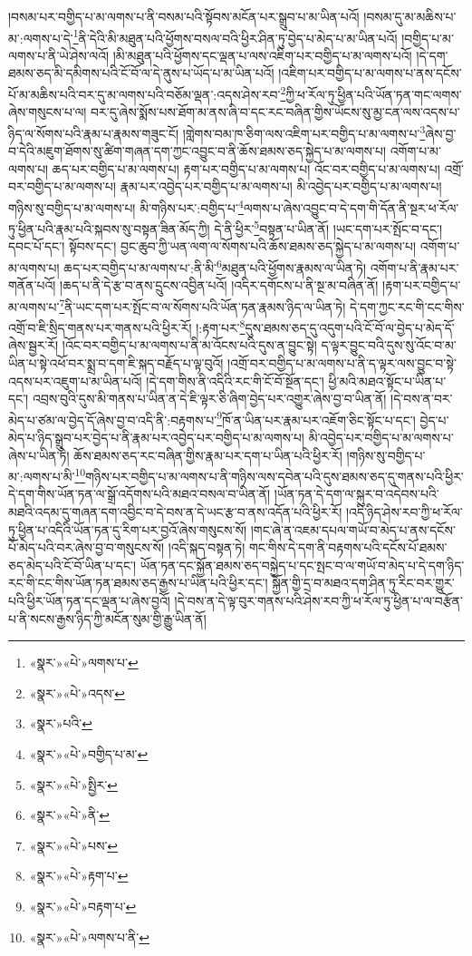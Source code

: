 །བསམ་པར་བགྱིད་པ་མ་ལགས་པ་ནི་བསམ་པའི་སྟོབས་མངོན་པར་སྒྲུབ་པ་མ་ཡིན་པའོ། །བསམ་དུ་མ་མཆིས་པ་མ་:ལགས་པ་དེ་\footnote{«སྣར་»«པེ་»ལགས་པ་}ནི་དེའི་མི་མཐུན་པའི་ཕྱོགས་བསལ་བའི་ཕྱིར་ཤིན་ཏུ་བྱེད་པ་མེད་པ་མ་ཡིན་པའོ། །བགྱིད་པ་མ་ལགས་པ་ནི་ཡེ་ཤེས་ལའོ། །མི་མཐུན་པའི་ཕྱོགས་དང་ལྡན་པ་ལས་འཇིག་པར་བགྱིད་པ་མ་ལགས་པའོ། །དེ་དག་ཐམས་ཅད་མི་དམིགས་པའི་ངོ་བོ་ལ་དེ་ནུས་པ་ཡོད་པ་མ་ཡིན་པའོ། །འཇིག་པར་བགྱིད་པ་མ་ལགས་པ་ནས་དངོས་པོ་མ་མཆིས་པའི་བར་དུ་མ་ལགས་པའི་བཅོམ་ལྡན་:འདས་ཤེས་རབ་\footnote{«སྣར་»«པེ་»འདས་}ཀྱི་ཕ་རོལ་ཏུ་ཕྱིན་པའི་ཡོན་ཏན་གང་ལགས་ཞེས་གསུངས་པ་ལ། བར་དུ་ཞེས་སྨོས་པས་ཐོག་མ་ནས་ཞི་བ་དང་རང་བཞིན་གྱིས་ཡོངས་སུ་མྱ་ངན་ལས་འདས་པ་ཉིད་ལ་སོགས་པའི་རྣམ་པ་རྣམས་གཟུང་ངོ། །གླེགས་བམ་ཁ་ཅིག་ལས་འཇིག་པར་བགྱིད་པ་མ་ལགས་པ་\footnote{«སྣར་»པའི་}ཞེས་བྱ་བ་དེའི་མཇུག་ཐོགས་སུ་ཚིག་གཞན་དག་ཀྱང་འབྱུང་བ་ནི་ཆོས་ཐམས་ཅད་སྐྱེད་པ་མ་ལགས་པ། འགོག་པ་མ་ལགས་པ། ཆད་པར་བགྱིད་པ་མ་ལགས་པ། རྟག་པར་བགྱིད་པ་མ་ལགས་པ། འོང་བར་བགྱིད་པ་མ་ལགས་པ། འགྲོ་བར་བགྱིད་པ་མ་ལགས་པ། རྣམ་པར་འབྱེད་པར་བགྱིད་པ་མ་ལགས་པ། མི་འབྱེད་པར་བགྱིད་པ་མ་ལགས་པ། གཉིས་སུ་བགྱིད་པ་མ་ལགས་པ། མི་གཉིས་པར་:བགྱིད་པ་\footnote{«སྣར་»«པེ་»བགྱིད་པ་མ་}ལགས་པ་ཞེས་འབྱུང་བ་དེ་དག་གི་དོན་ནི་སྔར་ཕ་རོལ་ཏུ་ཕྱིན་པའི་རྣམ་པའི་སྐབས་སུ་བསྟན་ཟིན་མོད་ཀྱི། དེ་ནི་ཕྱིར་\footnote{«སྣར་»«པེ་»སྤྱིར་}བསྟན་པ་ཡིན་ནོ། །ཡང་དག་པར་སྤོང་བ་དང་། དབང་པོ་དང་། སྟོབས་དང་། བྱང་ཆུབ་ཀྱི་ཡན་ལག་ལ་སོགས་པའི་ཆོས་ཐམས་ཅད་སྐྱེད་པ་མ་ལགས་པ། འགོག་པ་མ་ལགས་པ། ཆད་པར་བགྱིད་པ་མ་ལགས་པ་:ནི་མི་\footnote{«སྣར་»«པེ་»ནི་}མཐུན་པའི་ཕྱོགས་རྣམས་ལ་ཡིན་ཏེ། འགོག་པ་ནི་རྣམ་པར་གནོན་པའོ། །ཆད་པ་ནི་དེ་རྩ་བ་ནས་དྲུངས་འབྱིན་པའོ། །འདིར་དགོངས་པ་ནི་སྔ་མ་བཞིན་ནོ། །རྟག་པར་བགྱིད་པ་མ་ལགས་པ་\footnote{«སྣར་»«པེ་»པས་}ནི་ཡང་དག་པར་སྤོང་བ་ལ་སོགས་པའི་ཡོན་ཏན་རྣམས་ཉིད་ལ་ཡིན་ཏེ། དེ་དག་ཀྱང་རང་གི་ངང་གིས་འགྲོ་བ་ཇི་སྲིད་གནས་པར་གནས་པའི་ཕྱིར་རོ། །:རྟག་པར་\footnote{«སྣར་»«པེ་»རྟག་པ་}དུས་ཐམས་ཅད་དུ་འདུག་པའི་ངོ་བོ་ལ་བྱེད་པ་མེད་དོ་ཞེས་སྦྱར་རོ། །འོང་བར་བགྱིད་པ་མ་ལགས་པ་ནི་མ་འོངས་པའི་དུས་ན་བྱུང་སྟེ། ད་ལྟར་བྱུང་བའི་དུས་སུ་འོང་བ་མ་ཡིན་པ་སྟེ་འཕོ་བར་སྨྲ་བ་དག་ཇི་སྐད་བརྗོད་པ་ལྟ་བུའོ། །འགྲོ་བར་བགྱིད་པ་མ་ལགས་པ་ནི་ད་ལྟར་ལས་བྱུང་བ་སྟེ་འདས་པར་འཇུག་པ་མ་ཡིན་པའོ། །དེ་དག་གིས་ནི་འདིའི་རང་གི་ངོ་བོ་སྔོན་དང་། ཕྱི་མའི་མཐའ་སྟོང་པ་ཡིན་པ་དང་། འབྲས་བུའི་དུས་མི་གནས་པ་ཡིན་ན་དེ་ཇི་ལྟར་ཅི་ཞིག་བྱེད་པར་འགྱུར་ཞེས་བྱ་བ་ཡིན་ནོ། །དེ་བས་ན་བར་མེད་པ་ཙམ་ལ་བྱེད་དོ་ཞེས་བྱ་བ་འདི་ནི་:བརྟགས་པ་\footnote{«སྣར་»«པེ་»བརྟག་པ་}ཁོ་ན་ཡིན་པར་རྣམ་པར་འཇོག་ཅིང་སྟོང་པ་དང་། བྱེད་པ་མེད་པ་ཉིད་སྒྲུབ་པར་བྱེད་པ་ནི་རྣམ་པར་འབྱེད་པར་བགྱིད་པ་མ་ལགས་པ། མི་འབྱེད་པར་བགྱིད་པ་མ་ལགས་པ་ཞེས་པ་ཡིན་ཏེ། ཆོས་ཐམས་ཅད་རང་བཞིན་གྱིས་རྣམ་པར་དག་པ་ཡིན་པའི་ཕྱིར་རོ། །གཉིས་སུ་བགྱིད་པ་མ་:ལགས་པ་མི་\footnote{«སྣར་»«པེ་»ལགས་པ་ནི་}གཉིས་པར་བགྱིད་པ་མ་ལགས་པ་ནི་གཉིས་ལས་དབེན་པའི་དུས་ཐམས་ཅད་དུ་གནས་པའི་ཕྱིར་དེ་དག་གིས་ཡོན་ཏན་ལ་སྒྲོ་འདོགས་པའི་མཐའ་བསལ་བ་ཡིན་ནོ། །ཡོན་ཏན་དེ་དག་ལ་སྐུར་བ་འདེབས་པའི་མཐའི་འདམ་དུ་གཞན་དག་འབྱིང་བ་དེ་བས་ན་དེ་ཡང་རྩ་བ་ནས་འདོན་པའི་ཕྱིར་རོ། །འདི་ཉིད་ཤེས་རབ་ཀྱི་ཕ་རོལ་ཏུ་ཕྱིན་པ་འདིའི་ཡོན་ཏན་དུ་རིག་པར་བྱའོ་ཞེས་གསུངས་སོ། །གང་ཞེ་ན་འཇམ་དཔལ་གཡོ་བ་མེད་པ་ནས་དངོས་པོ་མེད་པའི་བར་ཞེས་བྱ་བ་གསུངས་སོ། །འདི་སྐད་བསྟན་ཏེ། གང་གིས་དེ་དག་ནི་བརྟགས་པའི་དངོས་པོ་ཐམས་ཅད་མེད་པའི་ངོ་བོ་ཡིན་པ་དང་། ཡོན་ཏན་དང་སྐྱོན་ཐམས་ཅད་བསྐྱེད་པ་དང་སྤང་བ་ལ་གཡོ་བ་མེད་པ་དེ་དག་ཉིད་རང་གི་ངང་གིས་ཡོན་ཏན་ཐམས་ཅད་རྒྱས་པ་ཡིན་པའི་ཕྱིར་དང་། སྐྱོན་གྱི་དྲ་བ་མཐའ་དག་ཤིན་ཏུ་རིང་བར་གྱུར་པའི་ཕྱིར་ཡོན་ཏན་དང་ལྡན་པ་ཞེས་བྱའོ། །དེ་བས་ན་དེ་ལྟ་བུར་གནས་པའི་ཤེས་རབ་ཀྱི་ཕ་རོལ་ཏུ་ཕྱིན་པ་ལ་བརྩོན་པ་ནི་སངས་རྒྱས་ཉིད་ཀྱི་མངོན་སུམ་གྱི་རྒྱུ་ཡིན་ནོ། 